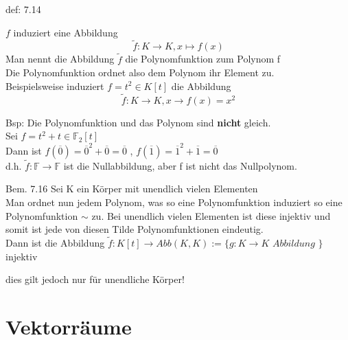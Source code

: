 \documentclass[headsepline,12pt,a4paper]{scrartcl}
\begin{document}
\begin{center}
\item[def: 7.14]
\end{center}
\item $f $ induziert eine Abbildung 
$$ \tilde{f} : K \rightarrow K , x \mapsto f(x)$$
Man nennt die Abbildung $\tilde{f}$ die Polynomfunktion zum Polynom f \\

Die Polynomfunktion ordnet also dem Polynom ihr Element zu. \\

Beispielsweise induziert $f=t^2 \in K[t]$ die Abbildung \\
$$ \tilde{f}: K \rightarrow K, x \rightarrow f(x)=x^2 $$

 

\item Bsp:
Die Polynomfunktion und das Polynom sind \textbf{nicht} gleich. \\
Sei $f = t^2 + t  \in \mathbb{F}_2[t]$  \\
Dann ist $f(\overline{0})= \overline{0}^2+\overline{0} = \overline{0} $ , $f(\overline{1})=\overline{1}^2+\overline{1}=\overline{0}$ \\

d.h. $\tilde{f}:\mathbb{F} \rightarrow \mathbb{F}$ ist die Nullabbildung, aber f ist nicht das Nullpolynom. \\

\newpage

\item[Bem. 7.16] 
Sei K ein Körper mit unendlich vielen Elementen \\
Man ordnet nun jedem Polynom, was so eine Polynomfunktion induziert so eine Polynomfunktion $\sim$ zu. Bei unendlich vielen Elementen ist diese injektiv und somit ist jede von diesen Tilde Polynomfunktionen eindeutig. \\
Dann ist die Abbildung $ \tilde{f}: K[t] \rightarrow Abb(K,K):=\{g: K \rightarrow K \textit{ Abbildung }\} $ injektiv \\

\item dies gilt jedoch nur für unendliche Körper!\\

\newpage

\section*{Vektorräume}
\end{document}
